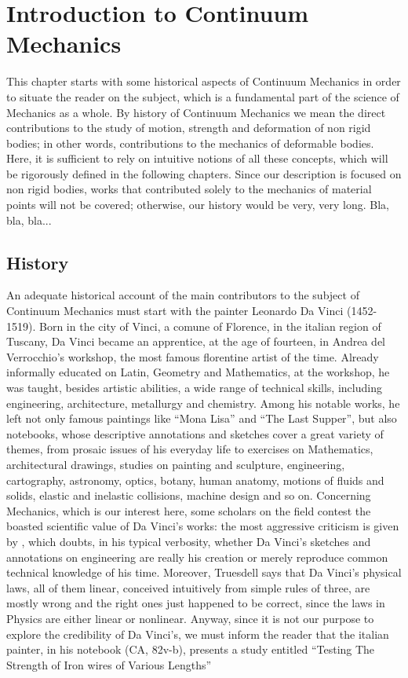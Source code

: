 \chapter{Introduction to Continuum Mechanics}\label{ch:Collect}


This chapter starts with some historical aspects of Continuum Mechanics in order to situate the reader on the subject, which is a fundamental part of the science of Mechanics as a whole. By history of Continuum Mechanics we mean the direct contributions to the study of motion, strength and deformation of non rigid bodies; in other words, contributions to the mechanics of deformable bodies. Here, it is sufficient to rely on intuitive notions of all these concepts, which will be rigorously defined in the following chapters. Since our description is focused on non rigid bodies, works that contributed solely to the mechanics of material points will not be covered; otherwise, our history would be very, very long. Bla, bla, bla... 


\section{History}


An adequate historical account of the main contributors to the subject of Continuum Mechanics must start with the painter Leonardo Da Vinci (1452-1519). Born in the city of Vinci, a comune of Florence, in the italian region of Tuscany, Da Vinci became an apprentice, at the age of fourteen, in Andrea del Verrocchio's workshop, the most famous florentine artist of the time. Already informally educated on Latin, Geometry and Mathematics, at the workshop, he was taught, besides artistic abilities, a wide range of technical skills, including engineering, architecture, metallurgy and chemistry. Among his notable works, he left not only famous paintings like ``Mona Lisa'' and ``The Last Supper'', but also notebooks, whose descriptive annotations and sketches cover a great variety of themes, from prosaic issues of his everyday life to exercises on Mathematics, architectural drawings, studies on painting and sculpture, engineering, cartography, astronomy, optics, botany, human anatomy, motions of fluids and solids, elastic and inelastic collisions, machine design and so on. Concerning Mechanics, which is our interest here, some scholars on the field contest the boasted scientific value of Da Vinci's works: the most aggressive criticism is given by \cite{truesdell_1968}, which doubts, in his typical verbosity, whether Da Vinci's sketches and annotations on engineering are really his creation or merely reproduce common technical knowledge of his time. Moreover, Truesdell says that Da Vinci's physical laws, all of them linear, conceived intuitively from simple rules of three, are mostly wrong and the right ones just happened to be correct, since the laws in Physics are either linear or nonlinear. Anyway, since it is not our purpose to explore the credibility of Da Vinci's, we must inform the reader that the italian painter, in his notebook (CA, 82v-b), presents a study entitled ``Testing The Strength of Iron wires of Various Lengths''

